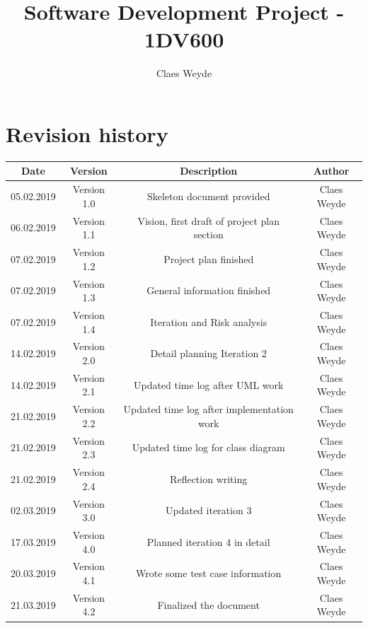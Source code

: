 \documentclass[12pt, letterpaper]{article}
\title{Software Development Project - 1DV600}
\author{Claes Weyde}
\begin{document}
\maketitle
\newpage
\tableofcontents{}
\newpage

\section{Revision history}
\begin{center}
	\begin{tabular}{|c|c|c|c|} 
		\hline
		Date & Version & Description & Author \\ [0.5ex] 
		\hline\hline
		05.02.2019 & Version 1.0 & Skeleton document provided & Claes Weyde \\
		\hline
		06.02.2019 & Version 1.1 & Vision, first draft of project plan section & 
		Claes Weyde \\
		\hline
		07.02.2019 & Version 1.2 & Project plan finished & Claes Weyde \\ [1ex] 
		\hline
		07.02.2019 & Version 1.3 & General information finished & Claes Weyde \\
		\hline
		07.02.2019 & Version 1.4 & Iteration and Risk analysis & Claes Weyde \\ 
		\hline
		14.02.2019 & Version 2.0 & Detail planning Iteration 2 & Claes Weyde \\
		\hline
		14.02.2019 & Version 2.1 & Updated time log after UML work & Claes Weyde \\
		\hline
		21.02.2019 & Version 2.2 & Updated time log after implementation work & Claes Weyde \\
		\hline
		21.02.2019 & Version 2.3 & Updated time log for class diagram & Claes Weyde \\
		\hline
		21.02.2019 & Version 2.4 & Reflection writing & Claes Weyde \\
		\hline
		02.03.2019 & Version 3.0 & Updated iteration 3 & Claes Weyde \\
		\hline
		17.03.2019 & Version 4.0 & Planned iteration 4 in detail & Claes Weyde \\
		\hline
		20.03.2019 & Version 4.1 & Wrote some test case information & Claes Weyde \\
		\hline
		21.03.2019 & Version 4.2 & Finalized the document & Claes Weyde \\
		[1ex]
		\hline
		
	\end{tabular}
\end{center}
\newpage
\end{document}
